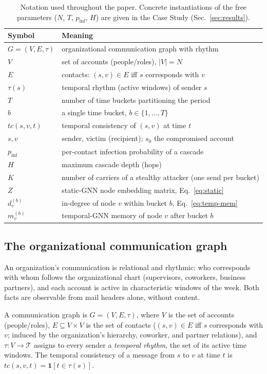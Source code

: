 \begin{table}[pos=tbp]\centering\small
\caption{Notation used throughout the paper. Concrete instantiations of the free
parameters ($N$, $T$, $p_\mathrm{inf}$, $H$) are given in the Case Study (Sec.~\ref{sec:results}).}
\label{tab:notation}
\begin{tabular}{ll}
\toprule
\textbf{Symbol} & \textbf{Meaning} \\
\midrule
$G=(V,E,\tau)$ & organizational communication graph with rhythm \\
$V$ & set of accounts (people/roles), $|V|=N$ \\
$E$ & contacts: $(s,v)\in E$ iff $s$ corresponds with $v$ \\
$\tau(s)$ & temporal rhythm (active windows) of sender $s$ \\
$T$ & number of time buckets partitioning the period \\
$b$ & a single time bucket, $b\in\{1,\dots,T\}$ \\
$tc(s,v,t)$ & temporal consistency of $(s,v)$ at time $t$ \\
$s,v$ & sender, victim (recipient); $s_0$ the compromised account \\
$p_\mathrm{inf}$ & per-contact infection probability of a cascade \\
$H$ & maximum cascade depth (hops) \\
$K$ & number of carriers of a stealthy attacker (one send per bucket) \\
$Z$ & static-GNN node embedding matrix, Eq.~\eqref{eq:static} \\
$d_v^{(b)}$ & in-degree of node $v$ within bucket $b$, Eq.~\eqref{eq:temp-mem} \\
$m_v^{(b)}$ & temporal-GNN memory of node $v$ after bucket $b$ \\
\bottomrule
\end{tabular}
\end{table}

\subsection{The organizational communication graph}
\label{sec:cg}
An organization's communication is relational and rhythmic: who corresponds with whom follows the
organizational chart (supervisors, coworkers, business partners), and each account is active in
characteristic windows of the week. Both facts are observable from mail headers alone, without content.

\begin{definition}
\label{def:cg}
A communication graph is $G=(V,E,\tau)$, where $V$ is the set of accounts (people/roles), $E\subseteq V\times V$
is the set of contacts ($(s,v)\in E$ iff $s$ corresponds with $v$; induced by the organization's hierarchy,
coworker, and partner relations), and $\tau:V\to\mathcal{T}$ assigns to every sender a \emph{temporal
rhythm}, the set of its active time windows. The temporal consistency of a message from $s$ to $v$ at time
$t$ is $tc(s,v,t)=\mathbf{1}[t\in\tau(s)]$.
\end{definition}

